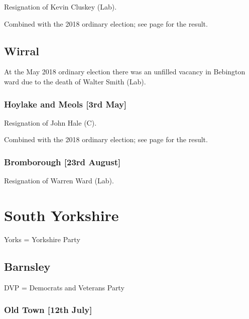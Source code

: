 \documentclass[a4paper,openany]{book}
\begin{document}
\begin{resultsiii}
Resignation of Kevin Cluskey (Lab).

Combined with the 2018 ordinary election; see page \pageref{FordSefton} for the result.

\subsection*{Wirral}

At the May 2018 ordinary election there was an unfilled vacancy in Bebington ward due to the death of Walter Smith (Lab).

\subsubsection*{Hoylake and Meols \hspace*{\fill}\nolinebreak[1]%
\enspace\hspace*{\fill}
[3rd May]}


Resignation of John Hale (C).

Combined with the 2018 ordinary election; see page \pageref{HoylakeMeolsWirral} for the result.

\subsubsection*{Bromborough \hspace*{\fill}\nolinebreak[1]%
\enspace\hspace*{\fill}
[23rd August]}


Resignation of Warren Ward (Lab).

\section{South Yorkshire}

Yorks = Yorkshire Party

\subsection*{Barnsley}

DVP = Democrats and Veterans Party

\subsubsection*{Old Town \hspace*{\fill}\nolinebreak[1]%
\enspace\hspace*{\fill}
[12th July]}


\end{resultsiii}
\end{document}

